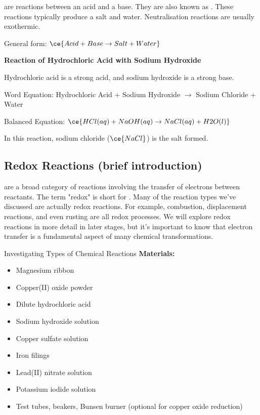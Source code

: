 { are reactions between an acid and a base. They are also known as .  These reactions typically produce a salt and water. Neutralisation reactions are usually exothermic.

General form: $\ce{Acid + Base \rightarrow Salt + Water}$

\begin{example}
\textbf{Reaction of Hydrochloric Acid with Sodium Hydroxide}

Hydrochloric acid is a strong acid, and sodium hydroxide is a strong base.

Word Equation: Hydrochloric Acid + Sodium Hydroxide $\rightarrow$ Sodium Chloride + Water

Balanced Equation: $\ce{HCl(aq) + NaOH(aq) \rightarrow NaCl(aq) + H2O(l)}$

In this reaction, sodium chloride ($\ce{NaCl}$) is the salt formed.
\end{example}

\subsection{Redox Reactions (brief introduction)}


 are a broad category of reactions involving the transfer of electrons between reactants.  The term "redox" is short for .  Many of the reaction types we've discussed are actually redox reactions. For example, combustion, displacement reactions, and even rusting are all redox processes.  We will explore redox reactions in more detail in later stages, but it's important to know that electron transfer is a fundamental aspect of many chemical transformations.

\begin{investigation}{Investigating Types of Chemical Reactions}
\textbf{Materials:}
\begin{itemize}
    \item Magnesium ribbon
    \item Copper(II) oxide powder
    \item Dilute hydrochloric acid
    \item Sodium hydroxide solution
    \item Copper sulfate solution
    \item Iron filings
    \item Lead(II) nitrate solution
    \item Potassium iodide solution
    \item Test tubes, beakers, Bunsen burner (optional for copper oxide reduction)
\end{itemize}


\end{investigation}}
